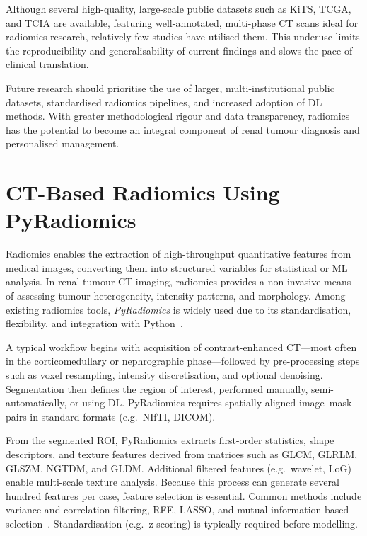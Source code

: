 Although several high-quality, large-scale public datasets such as KiTS, TCGA, and TCIA are available, featuring well-annotated, multi-phase CT scans ideal for radiomics research, relatively few studies have utilised them. This underuse limits the reproducibility and generalisability of current findings and slows the pace of clinical translation.

Future research should prioritise the use of larger, multi-institutional public datasets, standardised radiomics pipelines, and increased adoption of DL methods. With greater methodological rigour and data transparency, radiomics has the potential to become an integral component of renal tumour diagnosis and personalised management.

\section{CT-Based Radiomics Using PyRadiomics}

Radiomics enables the extraction of high-throughput quantitative features from medical images, converting them into structured variables for statistical or ML analysis. In renal tumour CT imaging, radiomics provides a non-invasive means of assessing tumour heterogeneity, intensity patterns, and morphology. Among existing radiomics tools, \textit{PyRadiomics} is widely used due to its standardisation, flexibility, and integration with Python~\cite{Griethuysen:2017}.

A typical workflow begins with acquisition of contrast-enhanced CT—most often in the corticomedullary or nephrographic phase—followed by pre-processing steps such as voxel resampling, intensity discretisation, and optional denoising. Segmentation then defines the region of interest, performed manually, semi-automatically, or using DL. PyRadiomics requires spatially aligned image–mask pairs in standard formats (e.g.\ NIfTI, DICOM).

From the segmented ROI, PyRadiomics extracts first-order statistics, shape descriptors, and texture features derived from matrices such as GLCM, GLRLM, GLSZM, NGTDM, and GLDM. Additional filtered features (e.g.\ wavelet, LoG) enable multi-scale texture analysis. Because this process can generate several hundred features per case, feature selection is essential. Common methods include variance and correlation filtering, RFE, LASSO, and mutual-information-based selection~\cite{VS, RFE}. Standardisation (e.g.\ z-scoring) is typically required before modelling.


